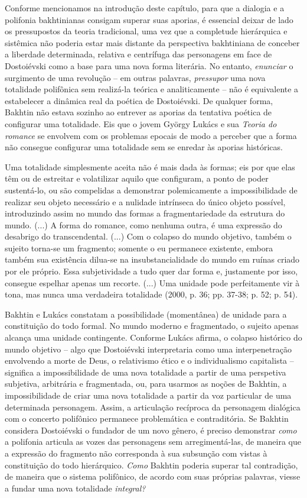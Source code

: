 Conforme mencionamos na introdução deste capítulo, para que a dialogia e
a polifonia bakhtinianas consigam superar suas aporias, é essencial
deixar de lado os pressupostos da teoria tradicional, uma vez que a
completude hierárquica e sistêmica não poderia estar mais distante da
perspectiva bakhtiniana de conceber a liberdade determinada, relativa e
centrífuga das personagens em face de Dostoiévski como a base para uma
nova forma literária. No entanto, \emph{enunciar} o surgimento de uma
revolução -- em outras palavras, \emph{pressupor} uma nova totalidade
polifônica sem realizá-la teórica e analiticamente -- não é equivalente
a estabelecer a dinâmica real da poética de Dostoiévski. De qualquer
forma, Bakhtin não estava sozinho ao entrever as aporias da tentativa
poética de configurar uma totalidade. Eis que o jovem György Lukács e
sua \emph{Teoria do romance} se envolvem com os problemas epocais de
modo a perceber que a forma não consegue configurar uma totalidade sem
se enredar às aporias históricas.

Uma totalidade simplesmente aceita não é mais dada às formas; eis por
que elas têm ou de estreitar e volatilizar aquilo que configuram, a
ponto de poder sustentá-lo, ou são compelidas a demonstrar polemicamente
a impossibilidade de realizar seu objeto necessário e a nulidade
intrínseca do único objeto possível, introduzindo assim no mundo das
formas a fragmentariedade da estrutura do mundo. (...) A forma do
romance, como nenhuma outra, é uma expressão do desabrigo do
transcendental. (...) Com o colapso do mundo objetivo, também o sujeito
torna-se um fragmento; somente o eu permanece existente, embora também
sua existência dilua-se na insubstancialidade do mundo em ruínas criado
por ele próprio. Essa subjetividade a tudo quer dar forma e, justamente
por isso, consegue espelhar apenas um recorte. (...) Uma unidade pode
perfeitamente vir à tona, mas nunca uma verdadeira totalidade (2000, p.
36; pp. 37-38; p. 52; p. 54).

Bakhtin e Lukács constatam a possibilidade (momentânea) de unidade para
a constituição do todo formal. No mundo moderno e fragmentado, o sujeito
apenas alcança uma unidade contingente. Conforme Lukács afirma, o
colapso histórico do mundo objetivo -- algo que Dostoiévski
interpretaria como uma interpenetração envolvendo a morte de Deus, o
relativismo ético e o individualismo capitalista -- significa a
impossibilidade de uma nova totalidade a partir de uma perspetiva
subjetiva, arbitrária e fragmentada, ou, para usarmos as noções de
Bakhtin, a impossibilidade de criar uma nova totalidade a partir da voz
particular de uma determinada personagem. Assim, a articulação recíproca
da personagem dialógica com o concerto polifônico permanece problemática
e contraditória. Se Bakhtin considera Dostoiévski o fundador de um novo
gênero, é preciso demonstrar \emph{como} a polifonia articula as vozes
das personagens sem arregimentá-las, de maneira que a expressão do
fragmento não corresponda à sua subsunção com vistas à constituição do
todo hierárquico. \emph{Como} Bakhtin poderia superar tal contradição,
de maneira que o sistema polifônico, de acordo com suas próprias
palavras, viesse a fundar uma nova totalidade \emph{integral? }

